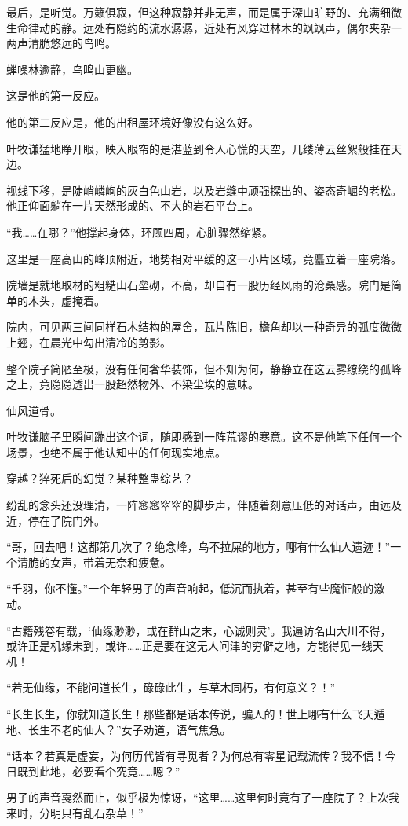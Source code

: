 最后，是听觉。万籁俱寂，但这种寂静并非无声，而是属于深山旷野的、充满细微生命律动的静。远处有隐约的流水潺潺，近处有风穿过林木的飒飒声，偶尔夹杂一两声清脆悠远的鸟鸣。

蝉噪林逾静，鸟鸣山更幽。

这是他的第一反应。

他的第二反应是，他的出租屋环境好像没有这么好。

叶牧谦猛地睁开眼，映入眼帘的是湛蓝到令人心慌的天空，几缕薄云丝絮般挂在天边。

视线下移，是陡峭嶙峋的灰白色山岩，以及岩缝中顽强探出的、姿态奇崛的老松。他正仰面躺在一片天然形成的、不大的岩石平台上。

“我……在哪？”他撑起身体，环顾四周，心脏骤然缩紧。

这里是一座高山的峰顶附近，地势相对平缓的这一小片区域，竟矗立着一座院落。

院墙是就地取材的粗糙山石垒砌，不高，却自有一股历经风雨的沧桑感。院门是简单的木头，虚掩着。

院内，可见两三间同样石木结构的屋舍，瓦片陈旧，檐角却以一种奇异的弧度微微上翘，在晨光中勾出清冷的剪影。

整个院子简陋至极，没有任何奢华装饰，但不知为何，静静立在这云雾缭绕的孤峰之上，竟隐隐透出一股超然物外、不染尘埃的意味。

仙风道骨。

叶牧谦脑子里瞬间蹦出这个词，随即感到一阵荒谬的寒意。这不是他笔下任何一个场景，也绝不属于他认知中的任何现实地点。

穿越？猝死后的幻觉？某种整蛊综艺？

纷乱的念头还没理清，一阵窸窸窣窣的脚步声，伴随着刻意压低的对话声，由远及近，停在了院门外。

“哥，回去吧！这都第几次了？绝念峰，鸟不拉屎的地方，哪有什么仙人遗迹！”一个清脆的女声，带着无奈和疲惫。

“千羽，你不懂。”一个年轻男子的声音响起，低沉而执着，甚至有些魔怔般的激动。

“古籍残卷有载，‘仙缘渺渺，或在群山之末，心诚则灵’。我遍访名山大川不得，或许正是机缘未到，或许……正是要在这无人问津的穷僻之地，方能得见一线天机！

“若无仙缘，不能问道长生，碌碌此生，与草木同朽，有何意义？！”

“长生长生，你就知道长生！那些都是话本传说，骗人的！世上哪有什么飞天遁地、长生不老的仙人？”女子劝道，语气焦急。

“话本？若真是虚妄，为何历代皆有寻觅者？为何总有零星记载流传？我不信！今日既到此地，必要看个究竟……嗯？”

男子的声音戛然而止，似乎极为惊讶，“这里……这里何时竟有了一座院子？上次我来时，分明只有乱石杂草！”

